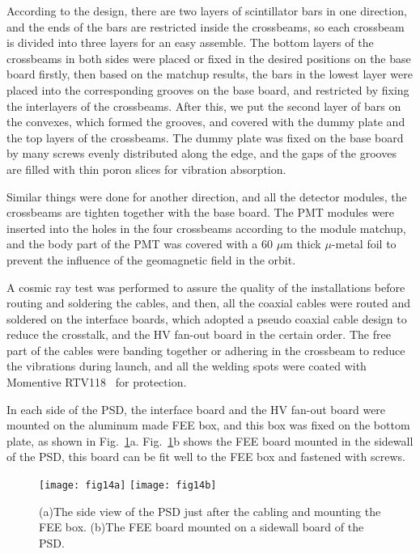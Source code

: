 \documentclass[preprint]{elsarticle}
\begin{document}
According to the design, there are two layers of scintillator bars in one direction, and the ends of the bars are restricted inside the crossbeams, so each crossbeam is divided into three layers for an easy assemble.
The bottom layers of the crossbeams in both sides were placed or fixed in the desired positions on the base board firstly, then based on the matchup results, the bars in the lowest layer were placed into the corresponding grooves on the base board, and restricted by fixing the interlayers of the crossbeams. After this, we put the second layer of bars on the convexes, which formed the grooves, and covered with the dummy plate and the top layers of the crossbeams. The dummy plate was fixed on the base board by many screws evenly distributed along the edge, and the gaps of the grooves are filled with thin poron slices for vibration absorption.

Similar things were done for another direction, and all the detector modules, the crossbeams are tighten together with the base board. The PMT modules were inserted into the holes in the four crossbeams according to the module matchup, and the body part of the PMT was covered with a 60 $\mu$m thick $\mu$-metal foil to prevent the influence of the geomagnetic field in the orbit.

A cosmic ray test was performed to assure the quality of the installations before routing and soldering the cables, and then, all the coaxial cables were routed and soldered on the interface boards, which adopted a pseudo coaxial cable design to reduce the crosstalk, and the HV fan-out board in the certain order. The free part of the cables were banding together or adhering in the crossbeam to reduce the vibrations during launch, and all the welding spots were coated with Momentive RTV118~\cite{rtv} for protection.

In each side of the PSD, the interface board and the HV fan-out board were mounted on the aluminum made FEE box, and this box was fixed on the bottom plate, as shown in Fig.~\ref{fig:fig14}a. Fig.~\ref{fig:fig14}b shows the FEE board mounted in the sidewall of the PSD, this board can be fit well to the FEE box and fastened with screws.

\begin{figure}[!ht]
	\centering
	 \texttt{[image: fig14a]}
	 \texttt{[image: fig14b]}
	\caption{(a)The side view of the PSD just after the cabling and mounting the FEE box. (b)The FEE board mounted on a sidewall board of the PSD.}
      \label{fig:fig14}
\end{figure}
\end{document}

